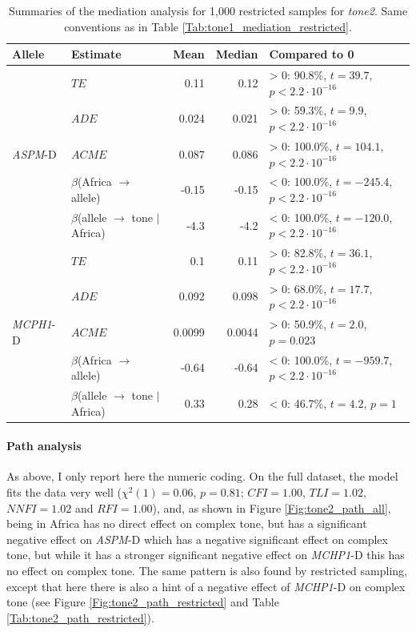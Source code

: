 \documentclass[twoside,onecolumn]{article}
\begin{document}
\begin{table}[h]
  \caption{Summaries of the mediation analysis for 1,000 restricted samples for \textit{tone2}. Same conventions as in Table \ref{Tab:tone1_mediation_restricted}.}
  \label{Tab:tone2_mediation_restricted}
  \centering
  \begin{tabular}{|l|l|r|r|l|}
    \toprule
    \textbf{Allele} & \textbf{Estimate} & \textbf{Mean} & \textbf{Median} & \textbf{Compared to 0} \\
    \midrule
    \multirow{5}{*}{\textit{ASPM}-D} & $TE$ & 0.11 & 0.12 & > 0: 90.8\%, $t = 39.7$, $p < 2.2\cdot10^{-16}$ \\
    & $ADE$ & 0.024 & 0.021 & > 0: 59.3\%, $t = 9.9$, $p < 2.2\cdot10^{-16}$ \\
    & $ACME$ & 0.087 & 0.086 & > 0: 100.0\%, $t = 104.1$, $p < 2.2\cdot10^{-16}$ \\
    & $\beta$(Africa $\rightarrow$ allele) & -0.15 &  -0.15 & < 0: 100.0\%, $t = -245.4$, $p < 2.2\cdot10^{-16}$ \\
    & $\beta$(allele $\rightarrow$ tone $\mid$ Africa) & -4.3 & -4.2 & < 0: 100.0\%, $t =  -120.0$, $p < 2.2\cdot10^{-16}$ \\
    \midrule
    \multirow{5}{*}{\textit{MCPH1}-D} & $TE$ & 0.1 & 0.11 & > 0: 82.8\%, $t = 36.1$, $p < 2.2\cdot10^{-16}$ \\
    & $ADE$ & 0.092 & 0.098 & > 0: 68.0\%, $t = 17.7$, $p < 2.2\cdot10^{-16}$ \\
    & $ACME$ & 0.0099 & 0.0044 & > 0: 50.9\%, $t = 2.0$, $p = 0.023$ \\
    & $\beta$(Africa $\rightarrow$ allele) & -0.64 & -0.64 & < 0: 100.0\%, $t = -959.7$, $p < 2.2\cdot10^{-16}$ \\
    & $\beta$(allele $\rightarrow$ tone $\mid$ Africa) & 0.33 & 0.28 & < 0: 46.7\%, $t = 4.2$, $p = 1$ \\
    \bottomrule
  \end{tabular}
\end{table}


\paragraph{Path analysis}

As above, I only report here the numeric coding.
On the full dataset, the model fits the data very well ($\chi^2(1) = 0.06$, $p = 0.81$; $CFI=1.00$, $TLI=1.02$, $NNFI=1.02$ and $RFI=1.00$), and, as shown in Figure \ref{Fig:tone2_path_all}, being in Africa has no direct effect on complex tone, but has a significant negative effect on \textit{ASPM}-D which has a negative significant effect on complex tone, but while it has a stronger significant negative effect on \textit{MCHP1}-D this has no effect on complex tone.
The same pattern is also found by restricted sampling, except that here there is also a hint of a negative effect of \textit{MCHP1}-D on complex tone (see Figure \ref{Fig:tone2_path_restricted} and Table \ref{Tab:tone2_path_restricted}).
\end{document}
